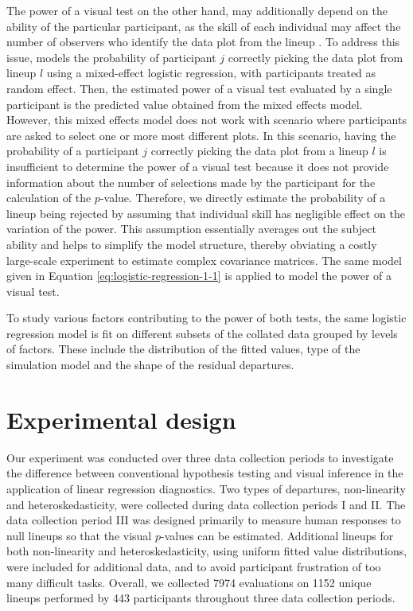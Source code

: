 \documentclass[]{interact}
\theoremstyle{plain}%
\theoremstyle{definition}
\theoremstyle{remark}
\begin{document}
The power of a visual test on the other hand, may additionally depend on
the ability of the particular participant, as the skill of each
individual may affect the number of observers who identify the data plot
from the lineup \citep{majumder2013validation}. To address this issue,
\citet{majumder2013validation} models the probability of participant
\(j\) correctly picking the data plot from lineup \(l\) using a
mixed-effect logistic regression, with participants treated as random
effect. Then, the estimated power of a visual test evaluated by a single
participant is the predicted value obtained from the mixed effects
model. However, this mixed effects model does not work with scenario
where participants are asked to select one or more most different plots.
In this scenario, having the probability of a participant \(j\)
correctly picking the data plot from a lineup \(l\) is insufficient to
determine the power of a visual test because it does not provide
information about the number of selections made by the participant for
the calculation of the \(p\)-value. Therefore, we directly estimate the
probability of a lineup being rejected by assuming that individual skill
has negligible effect on the variation of the power. This assumption
essentially averages out the subject ability and helps to simplify the
model structure, thereby obviating a costly large-scale experiment to
estimate complex covariance matrices. The same model given in Equation
\ref{eq:logistic-regression-1-1} is applied to model the power of a
visual test.

To study various factors contributing to the power of both tests, the
same logistic regression model is fit on different subsets of the
collated data grouped by levels of factors. These include the
distribution of the fitted values, type of the simulation model and the
shape of the residual departures.

\hypertarget{experimental-design}{%
\section{Experimental design}\label{experimental-design}}

Our experiment was conducted over three data collection periods to
investigate the difference between conventional hypothesis testing and
visual inference in the application of linear regression diagnostics.
Two types of departures, non-linearity and heteroskedasticity, were
collected during data collection periods I and II. The data collection
period III was designed primarily to measure human responses to null
lineups so that the visual \(p\)-values can be estimated. Additional
lineups for both non-linearity and heteroskedasticity, using uniform
fitted value distributions, were included for additional data, and to
avoid participant frustration of too many difficult tasks. Overall, we
collected 7974 evaluations on 1152 unique lineups performed by 443
participants throughout three data collection periods.
\end{document}
